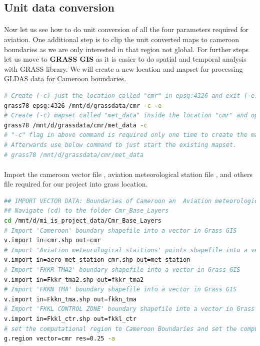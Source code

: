 \subsection{ Unit data conversion}
\paragraph{}
Now let us see how to do unit conversion of all the four parameters required for aviation. 
One additional step is to clip the unit converted maps to cameroon boundaries as we are only interested in that region not global.
\newline
For further steps let us move to \textbf{GRASS GIS} as it is easier to do spatial and temporal analysis with GRASS library. 
We will create a new location and mapset for processing GLDAS data for Cameroon boundaries.
\begin{lstlisting}[language=Bash]
# Create (-c) just the location called "cmr" in epsg:4326 and exit (-e)
grass78 epsg:4326 /mnt/d/grassdata/cmr -c -e
# Create (-c) mapset called "met_data" inside the location "cmr" and open GRASS GIS in "cmr/met_data" mapset
grass78 /mnt/d/grassdata/cmr/met_data -c
# "-c" flag in above command is required only one time to create the mapset met_data
# Afterwards use below command to just start the existing mapset.
# grass78 /mnt/d/grassdata/cmr/met_data
\end{lstlisting}
\paragraph{}
Import the cameroon vector file , aviation meteorological station file , and others file required for our project into grass location. 
\begin{lstlisting}[language=Bash]
## IMPORT VECTOR DATA: Boundaries of Cameroon an  Aviation meteorological station in cameroon
## Navigate (cd) to the folder Cmr_Base_Layers
cd /mnt/d/mi_is_project_data/Cmr_Base_Layers 
# Import 'Cameroon' boundary shapefile into a vector in Grass GIS
v.import in=cmr.shp out=cmr
# Import 'Aviation meteorological staitions' points shapefile into a vector in Grass GIS
v.import in=aero_met_station_cmr.shp out=met_station
# Import 'FKKR TMA2' boundary shapefile into a vector in Grass GIS
v.import in=Fkkr_tma2.shp out=fkkr_tma2
# Import 'FKKN TMA' boundary shapefile into a vector in Grass GIS
v.import in=Fkkn_tma.shp out=fkkn_tma
# Import 'FKKL CONTROL ZONE' boundary shapefile into a vector in Grass GIS
v.import in=Fkkl_ctr.shp out=fkkl_ctr
# set the computational region to Cameroon Boundaries and set the computational resolution to 0.25 degrees
g.region vector=cmr res=0.25 -a
\end{lstlisting}
\newpage
